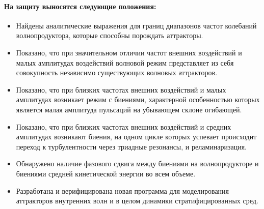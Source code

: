 \documentclass[utf8x]{G7-32} %
\begin{document}
\paragraph{На защиту выносятся следующие положения:}
\begin{itemize}

  \item Найдены аналитические выражения для границ диапазонов частот колебаний волнопродуктора, которые способны порождать аттракторы.

  \item Показано, что при значительном отличии частот внешних воздействий и малых амплитудах воздействий волновой режим представляет из себя совокупность независимо существующих волновых аттракторов.

  \item Показано, что при близких частотах внешних воздействий и малых амплитудах возникает режим с биениями, характерной особенностью которых является малая амплитуда пульсаций на убывающем склоне огибающей.

  \item Показано, что при близких частотах внешних воздействий и средних амплитудах возникают биения, на одном цикле которых успевает происходит переход к турбулентности через триадные резонансы, и реламинаризация.
    
  \item Обнаружено наличие фазового сдвига между биениями на волнопродукторе и биениями средней кинетической энергии во всем объеме.
    

  \item Разработана и верифицирована новая программа для моделирования аттракторов внутренних волн и в целом динамики стратифицированных сред.
    

    
    
    
\end{itemize}
\end{document}
